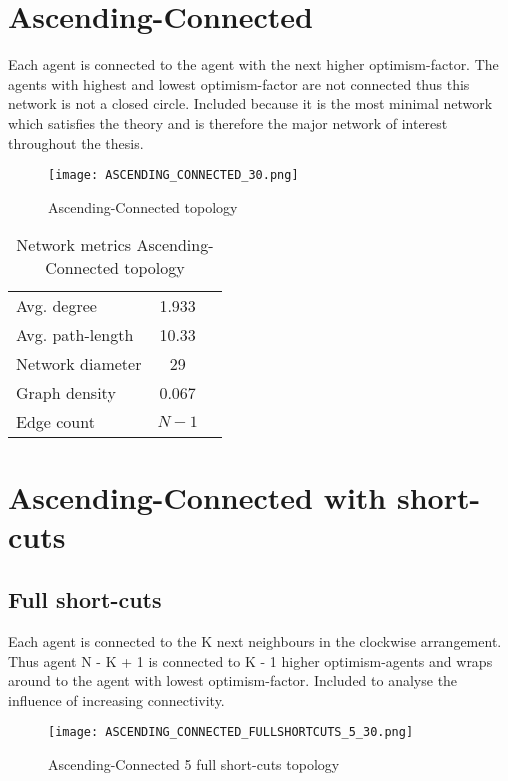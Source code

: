 \documentclass[Bachelorarbeit.tex]{subfiles}
\begin{document}
\section{Ascending-Connected}
Each agent is connected to the agent with the next higher optimism-factor. The agents with highest and lowest optimism-factor are not connected thus this network is not a closed circle.
\medskip
Included because it is the most minimal network which satisfies the theory and is therefore the major network of interest throughout the thesis.

\begin{figure}[H]
	\centering
  \texttt{[image: ASCENDING\_CONNECTED\_30.png]}
	\caption{Ascending-Connected topology}
	\label{fig:topology_ASCENDING_CONNECTED_30}
\end{figure}

\begin{table}[H]
	\centering
	\caption{Network metrics Ascending-Connected topology}
	\begin{tabular} { l c r }
		\hline
		Avg. degree & 1.933 \\
		Avg. path-length & 10.33 \\
		Network diameter & 29 \\
		Graph density & 0.067 \\
		Edge count & $N-1$ \\
		\hline
	\end{tabular}
\end{table}

\section{Ascending-Connected with short-cuts}
\subsection{Full short-cuts}
Each agent is connected to the K next neighbours in the clockwise arrangement. Thus agent N - K + 1 is connected to K - 1 higher optimism-agents and wraps around to the agent with lowest optimism-factor.
\medskip
Included to analyse the influence of increasing connectivity.

\begin{figure}[H]
	\centering
  \texttt{[image: ASCENDING\_CONNECTED\_FULLSHORTCUTS\_5\_30.png]}
	\caption{Ascending-Connected 5 full short-cuts topology}
	\label{fig:topology_ASCENDING_CONNECTED_FULLSHORTCUTS_5_30}
\end{figure}
\end{document}
